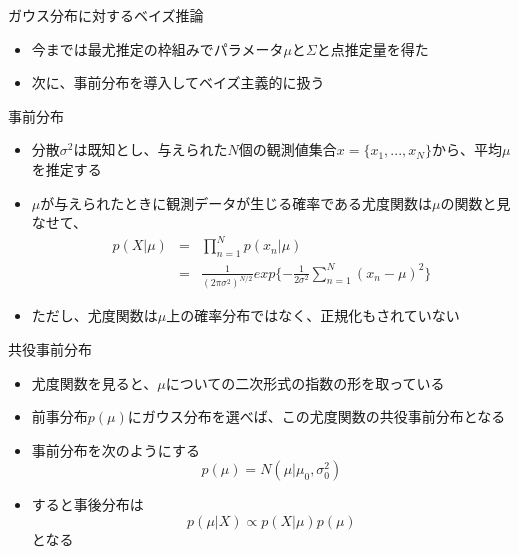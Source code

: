 				\begin{frame}{ガウス分布に対するベイズ推論}
 \begin{itemize}
  \item 今までは最尤推定の枠組みでパラメータ$\mu$と$\Sigma$と点推定量を得た
  \item 次に、事前分布を導入してベイズ主義的に扱う
 \end{itemize}
				\end{frame}

\begin{frame}{事前分布}
 \begin{itemize}
  \item 分散$\sigma^2$は既知とし、与えられた$N$個の観測値集合$x=\{x_1,...,x_N\}$から、平均$\mu$を推定する
  \item $\mu$が与えられたときに観測データが生じる確率である尤度関数は$\mu$の関数と見なせて、
	\begin{eqnarray*}
	 p(X|\mu) &= &\prod_{n=1}^{N}p(x_n|\mu) \\
	 &=& \frac{1}{(2\pi\sigma^2)^{N/2}}exp\{-\frac{1}{2\sigma^2}\sum_{n=1}^{N}(x_n-\mu)^2\}
	\end{eqnarray*}
  \item ただし、尤度関数は$\mu$上の確率分布ではなく、正規化もされていない
 \end{itemize}
\end{frame}

\begin{frame}{共役事前分布}
 \begin{itemize}
  \item 尤度関数を見ると、$\mu$についての二次形式の指数の形を取っている
  \item 前事分布$p(\mu)$にガウス分布を選べば、この尤度関数の共役事前分布となる
  \item 事前分布を次のようにする
  \begin{equation}
   p(\mu) = N(\mu|\mu_0,\sigma_0^2)
  \end{equation}
  \item すると事後分布は
\begin{equation}
 p(\mu|X) \propto p(X|\mu)p(\mu)
\end{equation}
        となる
 \end{itemize}
\end{frame}

